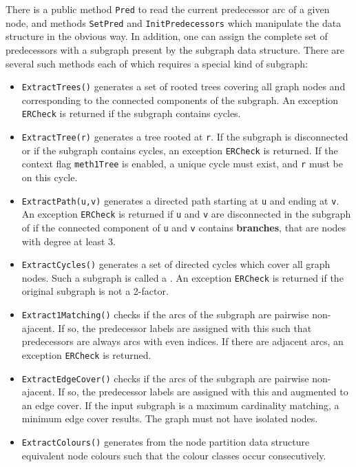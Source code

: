 \documentclass[a4paper,11pt,twoside]{book}
\begin{document}
\begin{multicols}{2}
There is a public method \verb/Pred/ to read the current predecessor arc of
a given node, and methods \verb/SetPred/ and \verb/InitPredecessors/ which
manipulate the data structure in the obvious way. In addition, one can assign 
the complete set of predecessors with a subgraph present by the subgraph data
structure. There are several such methods each of which requires a special kind
of subgraph: 
\begin{itemize}
\item \verb/ExtractTrees()/ generates a set of rooted trees covering
    all graph nodes and corresponding to the connected components of the
    subgraph. An exception \verb/ERCheck/ is returned if the subgraph contains
    cycles.
\item \verb/ExtractTree(r)/ generates a tree rooted at \verb/r/. If the
    subgraph is disconnected or if the subgraph contains cycles, an exception
    \verb/ERCheck/ is returned. If the context flag \verb/meth1Tree/ is
    enabled, a unique cycle must exist, and \verb/r/ must be on this cycle.
\item \verb/ExtractPath(u,v)/ generates a directed path starting at
    \verb/u/ and ending at \verb/v/. An exception \verb/ERCheck/ is returned if
    \verb/u/ and \verb/v/ are disconnected in the subgraph of if the connected
    component of \verb/u/ and \verb/v/ contains {\bf branches}, that are nodes
    with degree at least 3.
\item \verb/ExtractCycles()/ generates a set of directed cycles
    which cover all graph nodes. Such a subgraph is called a .
    An exception \verb/ERCheck/ is returned if the original subgraph is not a
    2-factor.
\item \verb/Extract1Matching()/ checks if the arcs of the subgraph
    are pairwise non-ajacent. If so, the predecessor labels are assigned with
    this  such that predecessors are always arcs with even
    indices. If there are adjacent arcs, an exception \verb/ERCheck/ is returned.
\item \verb/ExtractEdgeCover()/ checks if the arcs of the subgraph
    are pairwise non-ajacent. If so, the predecessor labels are assigned with
    this  and augmented to an edge cover. If the input subgraph
    is a maximum cardinality matching, a minimum edge cover results. The graph
    must not have isolated nodes.
\item \verb/ExtractColours()/ generates from the node partition data structure
    equivalent node colours such that the colour classes occur consecutively.
\end{itemize}



\end{multicols}
\end{document}
